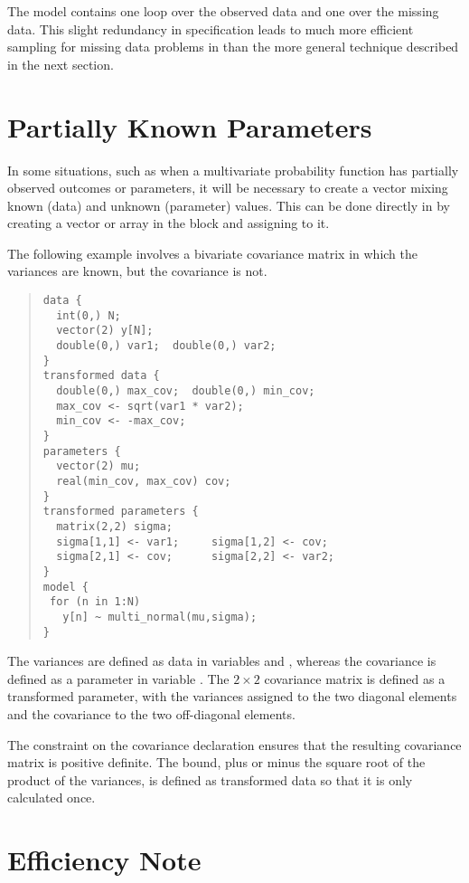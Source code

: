 The model contains one loop over the observed data and one over the
missing data.  This slight redundancy in specification leads to much
more efficient sampling for missing data problems in \Stan than the
more general technique described in the next section.


\section{Partially Known Parameters}\label{partially-known-parameters.section}

In some situations, such as when a multivariate probability function
has partially observed outcomes or parameters, it will be necessary to
create a vector mixing known (data) and unknown (parameter) values.
This can be done directly in \Stan by creating a vector or array in the
 block and assigning to it.

The following example involves a bivariate covariance matrix in which the
variances are known, but the covariance is not.
%
\begin{quote}
\begin{Verbatim}
data {
  int(0,) N;
  vector(2) y[N];
  double(0,) var1;  double(0,) var2;
}
transformed data {
  double(0,) max_cov;  double(0,) min_cov;   
  max_cov <- sqrt(var1 * var2);  
  min_cov <- -max_cov;
}
parameters {
  vector(2) mu;
  real(min_cov, max_cov) cov;
}
transformed parameters {
  matrix(2,2) sigma;
  sigma[1,1] <- var1;     sigma[1,2] <- cov;
  sigma[2,1] <- cov;      sigma[2,2] <- var2;
}  
model {
 for (n in 1:N)
   y[n] ~ multi_normal(mu,sigma);
}
\end{Verbatim}
\end{quote}
%
The variances are defined as data in variables  and
, whereas the covariance is defined as a parameter in
variable .  The $2 \times 2$ covariance matrix
 is defined as a transformed parameter, with the variances
assigned to the two diagonal elements and the covariance to the two
off-diagonal elements.

The constraint on the covariance declaration ensures that the
resulting covariance matrix  is positive definite.  The
bound, plus or minus the square root of the product of the variances,
is defined as transformed data so that it is only calculated once.

\section{Efficiency Note}


